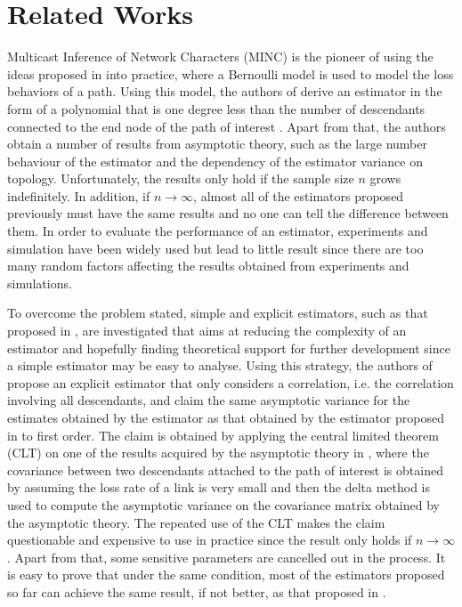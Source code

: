 \documentclass[10pt,onecolumn]{IEEEtran}
\begin{document}
\section{Related Works}\label{related work}

Multicast Inference of Network Characters (MINC) is the pioneer of using the ideas proposed in \cite{YV96} into practice, where a
Bernoulli model is used to model  the loss behaviors of a path. Using
this model, the authors of \cite{CDHT99} derive an estimator in the form of a polynomial that is one degree less than the number of descendants
connected to the end node of the path of interest \cite{CDHT99, CDMT99,CDMT99a}.  Apart from that, the authors obtain a number of results  from asymptotic theory, such as the large number behaviour of the estimator and the dependency of the estimator variance on topology. Unfortunately, the results only hold if the sample size $n$ grows indefinitely. In addition, if $n\rightarrow \infty$,  almost all of the estimators proposed previously must have the same results and no one can tell the difference between them.  In order to evaluate the performance of an estimator, experiments and simulation have been widely used but lead to little result since there are too many random factors affecting the results obtained from experiments and simulations.

To overcome the problem stated, simple and explicit estimators, such as that proposed in \cite{DHPT06}, are investigated that aims at reducing the complexity of an estimator and hopefully  finding theoretical support for further development since a simple estimator may be easy to analyse.
Using this strategy, the authors of \cite{DHPT06} propose an explicit estimator that only considers a correlation, i.e. the correlation involving all descendants, and claim the same asymptotic variance for the estimates obtained by the estimator as that obtained by the estimator proposed in \cite{CDHT99} to first
order. The claim is obtained by applying  the central limited theorem (CLT) on one of the results acquired by the asymptotic theory in \cite{CDHT99}, where  the covariance between two descendants attached to the path of interest is obtained by assuming the loss rate of a link is very small and then the delta method is used to compute the asymptotic variance on the covariance matrix obtained by the asymptotic theory. The repeated use of the CLT makes the claim questionable and expensive to use in practice since the result only holds if $n \rightarrow \infty$. Apart from that, some sensitive parameters are cancelled out in the process. It is easy to prove that under the same condition, most of the estimators proposed so far can achieve the same result, if not better,  as that proposed in \cite{DHPT06}.
\end{document}
